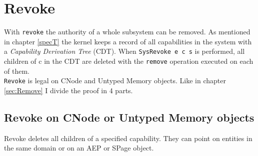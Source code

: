 \section{Revoke}\label{sec:Revoke}
With \texttt{revoke} the authority of a whole subsystem can be removed. As mentioned in chapter \ref{specT} the kernel keeps a record of all capabilities in the system with a \textit{Capability Derivation Tree} (CDT). When \texttt{SysRevoke e c s} is performed, all children of c in the CDT are deleted with the \texttt{remove} operation executed on each of them. \\
\texttt{Revoke} is legal on CNode and Untyped Memory objects. Like in chapter \ref{sec:Remove} I divide the proof in 4 parts. 
\subsection{Revoke on CNode or Untyped Memory objects} 
Revoke deletes all children of a specified capability. They can point on entities in the same domain or on an AEP or SPage object. 
